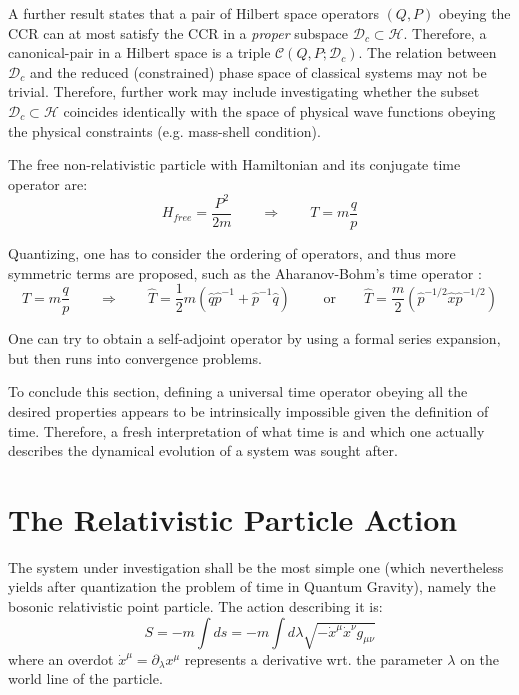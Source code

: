 \documentclass[twoside,a4paper,11pt]{article}
\numberwithin{equation}{section}
\begin{document}
A further result \cite{galaponcanonicaltriple} states that a pair of Hilbert space operators $(Q, P)$ obeying the CCR can at most satisfy the CCR in a \textit{proper} subspace $\mathcal{D}_c \subset \mathcal{H}$. Therefore, a canonical-pair in a Hilbert space is a triple $\mathcal{C}\left( Q,P; \mathcal{D}_c\right)$. The relation between $\mathcal{D}_c$ and the reduced (constrained) phase space of classical systems may not be trivial. Therefore, further work may include investigating whether the subset $\mathcal{D}_c \subset \mathcal{H}$ coincides identically with the space of physical wave functions obeying the physical constraints (e.g. mass-shell condition).

The free non-relativistic particle with Hamiltonian and its conjugate time operator are:
\begin{equation}
    H_{free} = \frac{P^2}{2m} \qquad \Rightarrow \qquad T = m\frac{q}{p}
\end{equation}

Quantizing, one has to consider the ordering of operators, and thus more symmetric terms are proposed, such as the Aharanov-Bohm's time operator \cite{AharonovBohm}:
\begin{equation}
T = m \dfrac{q}{p} \qquad \Rightarrow \qquad \hat{T} = \dfrac{1}{2}m \left( \hat{q}\hat{p}^{-1} + \hat{p}^{-1}\hat{q}\right) \qquad \text{ or} \qquad \hat{T} = \dfrac{m}{2} \left( \hat{p}^{-1/2} \hat{x} \hat{p}^{-1/2} \right)
\end{equation}

One can try to obtain a self-adjoint operator by using a formal series expansion, but then runs into convergence problems.

To conclude this section, defining a universal time operator obeying all the desired properties appears to be intrinsically impossible given the definition of time. Therefore, a fresh interpretation of what time is and which one actually describes the dynamical evolution of a system was sought after.

\newpage


\section{The Relativistic Particle Action}
\label{sec:relaprticleaction}
The system under investigation shall be the most simple one (which nevertheless yields after quantization the problem of time in Quantum Gravity), namely the bosonic relativistic point particle. The action describing it is:
\begin{equation}
S = - m \int ds = - m \int d\lambda \sqrt{-\dot{x}^\mu\dot{x}^\nu g_{\mu\nu}}
\label{basicaction}
\end{equation}
where an overdot $\dot{x}^\mu = \partial_\lambda x^\mu$ represents a derivative wrt. the parameter $\lambda$ on the world line of the particle.
\end{document}
